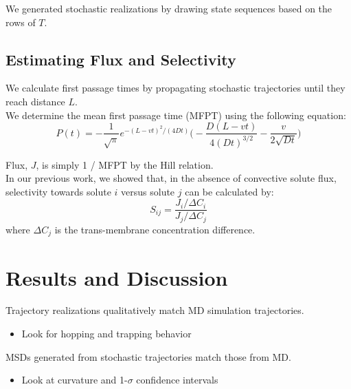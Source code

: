 \documentclass{article}
\begin{document}
  We generated stochastic realizations by drawing state sequences based on the
  rows of $T$. 
  
  \subsection{Estimating Flux and Selectivity}
  
  \noindent We calculate first passage times by propagating stochastic trajectories until they
  reach distance $L$. \\
  
  We determine the mean first passage time (MFPT) using the following equation:~\cite{cussler_diffusion:_2009}
  \begin{equation}
  P(t) = -\frac{1}{\sqrt{\pi}}e^{-(L - vt)^2 / (4Dt)}\bigg(-\frac{D(L - vt)}{4(Dt)^{3/2}} - \frac{v}{2\sqrt{Dt}}\bigg)
  \label{eqn:passage_times}
  \end{equation}
  
  \noindent Flux, $J$, is simply 1 / MFPT by the Hill relation.~\cite{hill_free_1989} \\
  
  In our previous work, we showed that, in the absence of convective solute flux, selectivity
  towards solute $i$ versus solute $j$ can be calculated by:  
  \begin{equation}
  S_{ij} = \frac{J_i / \Delta C_i}{J_j / \Delta C_j}
  \label{eqn:selectivity}
  \end{equation}
  where $\Delta C_j$ is the trans-membrane concentration difference.

  \section{Results and Discussion}
  
  \noindent Trajectory realizations qualitatively match MD simulation trajectories.
  \begin{itemize}
    \item Look for hopping and trapping behavior
  \end{itemize}
  
  \noindent MSDs generated from stochastic trajectories match those from MD.
  \begin{itemize}
  	\item Look at curvature and 1-$\sigma$ confidence intervals
  \end{itemize}
  
\end{document}
